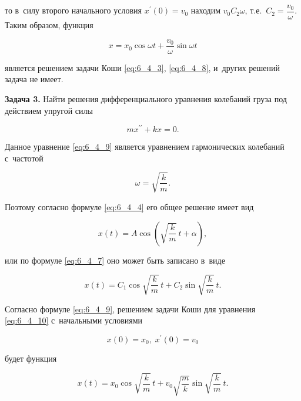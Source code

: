 \noindent
то в~силу второго начального условия $x^\prime (0) = v_{0}$ находим $v_{0} C_{2} \omega$,
т.е.\ $C_{2} = \dfrac{v_{0}}{\omega}$. Таким образом, функция

\begin{equation}\label{eq:6_4_9}
x = x_{0} \cos \omega t + \dfrac{v_{0}}{\omega} \sin \omega t
\end{equation}

\noindent
является решением задачи Коши \eqref{eq:6_4_3}, \eqref{eq:6_4_8}, и~других решений
задача не имеет.

\textbf{Задача 3.}\label{ex:6_4_3} Найти решения дифференциального уравнения
колебаний груза под действием упругой силы

\begin{equation}\label{eq:6_4_10}
mx^{\prime\prime} + kx = 0.
\end{equation}

Данное уравнение \eqref{eq:6_4_9} является уравнением гармонических колебаний
с~частотой

\begin{equation*}
\omega = \sqrt{\dfrac{k}{m}}.
\end{equation*}

Поэтому согласно формуле \eqref{eq:6_4_4} его общее решение имеет вид

\begin{equation*}
x(t) = A \cos \left ( \sqrt{\dfrac{k}{m}} \, t + \alpha \right ) ,
\end{equation*}

\noindent
или по формуле \eqref{eq:6_4_7} оно может быть записано в~виде

\begin{equation*}
x(t) = C_{1} \cos \sqrt{\dfrac{k}{m}} \, t + C_{2} \sin \sqrt{\dfrac{k}{m}} \, t.
\end{equation*}

\noindent
Согласно формуле \eqref{eq:6_4_9}, решением задачи Коши для уравнения \eqref{eq:6_4_10}
с~начальными условиями

\begin{equation}\label{eq:6_4_11}
x(0) = x_{0}, \; x^\prime (0) = v_{0}
\end{equation}

\noindent
будет функция

\begin{equation}
x(t) =
x_{0} \cos \sqrt{\dfrac{k}{m}} \, t +
v_{0} \sqrt{\dfrac{m}{k}} \sin \sqrt{\dfrac{k}{m}} \, t.
\end{equation}

